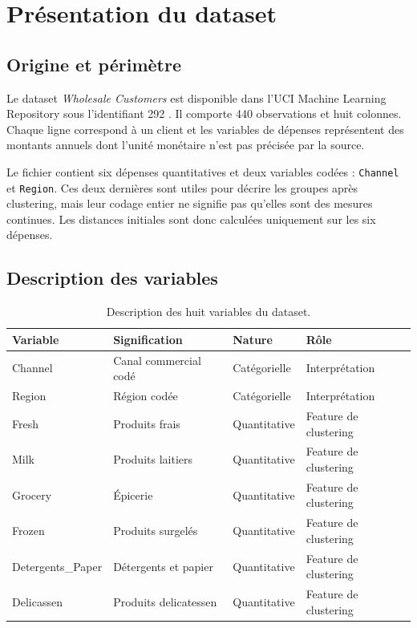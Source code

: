 \chapter{Présentation du dataset}

\section{Origine et périmètre}
Le dataset \textit{Wholesale Customers} est disponible dans l'UCI Machine Learning Repository sous l'identifiant 292 \cite{uciWholesale}. Il comporte 440 observations et huit colonnes. Chaque ligne correspond à un client et les variables de dépenses représentent des montants annuels dont l'unité monétaire n'est pas précisée par la source.

Le fichier contient six dépenses quantitatives et deux variables codées : \texttt{Channel} et \texttt{Region}. Ces deux dernières sont utiles pour décrire les groupes après clustering, mais leur codage entier ne signifie pas qu'elles sont des mesures continues. Les distances initiales sont donc calculées uniquement sur les six dépenses.

\section{Description des variables}
\begin{table}[H]
\centering\small
\caption{Description des huit variables du dataset.}
\label{tab:variables}
\begin{tabularx}{\textwidth}{>{\ttfamily}l X l X}
\toprule
Variable & Signification & Nature & Rôle \\
\midrule
Channel & Canal commercial codé & Catégorielle & Interprétation \\
Region & Région codée & Catégorielle & Interprétation \\
Fresh & Produits frais & Quantitative & Feature de clustering \\
Milk & Produits laitiers & Quantitative & Feature de clustering \\
Grocery & Épicerie & Quantitative & Feature de clustering \\
Frozen & Produits surgelés & Quantitative & Feature de clustering \\
Detergents\_Paper & Détergents et papier & Quantitative & Feature de clustering \\
Delicassen & Produits delicatessen & Quantitative & Feature de clustering \\
\bottomrule
\end{tabularx}
\end{table}

